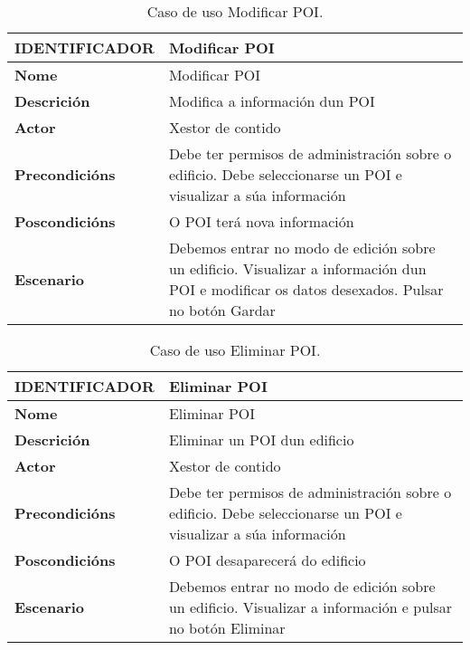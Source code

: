 \begin{table}[tbh]
	\begin{tabular}{|l|p{10cm}|}
		\hline 
		\textbf{IDENTIFICADOR}	& \textbf{Modificar POI} \\ 
		\hline 
		\textbf{Nome} & Modificar POI \\ 
		\hline 
		\textbf{Descrición} & Modifica a información dun POI \\ 
		\hline 
		\textbf{Actor} & Xestor de contido \\ 
		\hline 
		\textbf{Precondicións} &  Debe ter permisos de administración sobre o edificio. Debe seleccionarse un POI e visualizar a súa información \\ 
		\hline 
		\textbf{Poscondicións} & O POI terá nova información \\ 
		\hline 
		\textbf{Escenario} & Debemos entrar no modo de edición sobre un edificio. Visualizar a información dun POI e modificar os datos desexados. Pulsar no botón Gardar \\ 
		\hline 
	\end{tabular}
	\caption{Caso de uso Modificar POI.}
	\label{tab:cuModificarPOI}
\end{table}

\begin{table}[tbh]
	\begin{tabular}{|l|p{10cm}|}
		\hline 
		\textbf{IDENTIFICADOR}	& \textbf{Eliminar POI} \\ 
		\hline 
		\textbf{Nome} & Eliminar POI \\ 
		\hline 
		\textbf{Descrición} & Eliminar un POI dun edificio \\ 
		\hline 
		\textbf{Actor} & Xestor de contido \\ 
		\hline 
		\textbf{Precondicións} & Debe ter permisos de administración sobre o edificio. Debe seleccionarse un POI e visualizar a súa información \\ 
		\hline 
		\textbf{Poscondicións} & O POI desaparecerá do edificio \\ 
		\hline 
		\textbf{Escenario} & Debemos entrar no modo de edición sobre un edificio. Visualizar a información e pulsar no botón Eliminar \\ 
		\hline 
	\end{tabular}
	\caption{Caso de uso Eliminar POI.}
	\label{tab:cuEliminarPOI}
\end{table}

